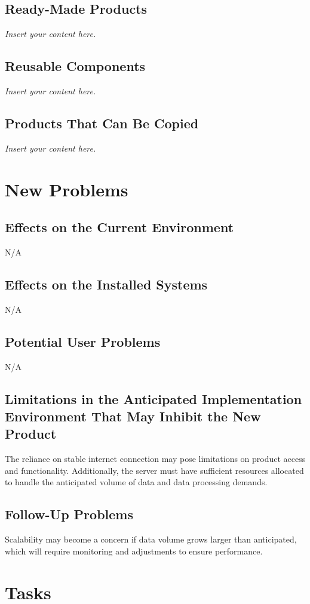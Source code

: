 \documentclass[12pt]{article}
\newcommand{\lips}{\textit{Insert your content here.}}
\begin{document}
\subsection{Ready-Made Products}
\lips
\subsection{Reusable Components}
\lips
\subsection{Products That Can Be Copied}
\lips

\section{New Problems}
\subsection{Effects on the Current Environment}
N/A

\subsection{Effects on the Installed Systems}
N/A

\subsection{Potential User Problems}
N/A

\subsection{Limitations in the Anticipated Implementation Environment That May
Inhibit the New Product}
The reliance on stable internet connection may pose limitations on product access and functionality. Additionally, the server must have sufficient resources allocated to handle the anticipated volume of data and data processing demands.

\subsection{Follow-Up Problems}
Scalability may become a concern if data volume grows larger than anticipated, which will require monitoring and adjustments to ensure performance.

\section{Tasks}
\end{document}
